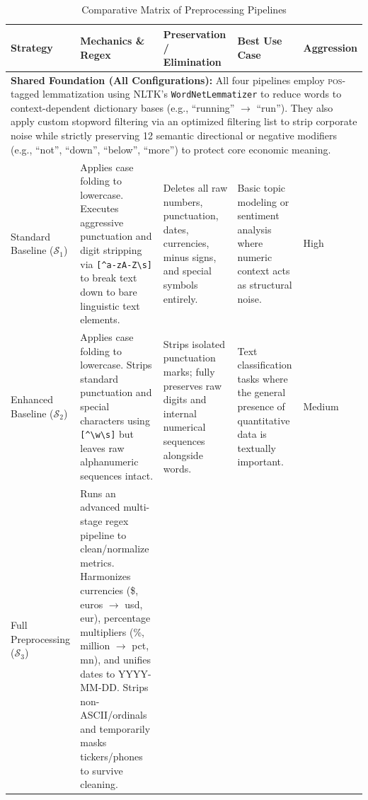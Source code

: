 \documentclass[manuscript,screen,review, nonacm]{acmart}
\begin{document}
\begin{table}[t]
    \centering
    \small
    \caption{Comparative Matrix of Preprocessing Pipelines}
    \vspace{0.5em}
    \begin{tabularx}{\textwidth}{l >{\hsize=1.4\hsize}X >{\hsize=0.8\hsize}X >{\hsize=0.8\hsize}X l}
        \toprule
        \textbf{Strategy} & \textbf{Mechanics \& Regex} & \textbf{Preservation / Elimination} & \textbf{Best Use Case} & \textbf{Aggression} \\
        \midrule
        \multicolumn{5}{p{\dimexpr\textwidth-2\tabcolsep\relax}}{\textbf{Shared Foundation (All Configurations):}
        All four pipelines employ \textsc{pos}-tagged lemmatization using NLTK's \texttt{WordNetLemmatizer} to reduce words to context-dependent dictionary bases (e.g., ``running'' $\rightarrow$ ``run''). They also apply custom stopword filtering via an optimized filtering list to strip corporate noise while strictly preserving 12 semantic directional or negative modifiers (e.g., ``not'', ``down'', ``below'', ``more'') to protect core economic meaning.} \\
        \midrule
        Standard \newline Baseline ($\mathcal{S}_1$) &
        Applies case folding to lowercase. Executes aggressive punctuation and digit stripping via \texttt{[\^{}a-zA-Z\textbackslash s]} to break text down to bare linguistic text elements. &
        Deletes all raw numbers, punctuation, dates, currencies, minus signs, and special symbols entirely. &
        Basic topic modeling or sentiment analysis where numeric context acts as structural noise. &
        High \\
        \addlinespace
        Enhanced \newline Baseline ($\mathcal{S}_2$) &
        Applies case folding to lowercase. Strips standard punctuation and special characters using \texttt{[\^{}\textbackslash w\textbackslash s]} but leaves raw alphanumeric sequences intact. &
        Strips isolated punctuation marks; fully preserves raw digits and internal numerical sequences alongside words. &
        Text classification tasks where the general presence of quantitative data is textually important. &
        Medium \\
        \addlinespace
        Full \newline Preprocessing ($\mathcal{S}_3$) &
        Runs an advanced multi-stage regex pipeline to clean/normalize metrics. Harmonizes currencies (\$, euros $\rightarrow$ usd, eur), percentage multipliers (\%, million $\rightarrow$ pct, mn), and unifies dates to YYYY-MM-DD. Strips non-ASCII/ordinals and temporarily masks tickers/phones to survive cleaning. &

\end{tabularx}
\end{table}
\end{document}
